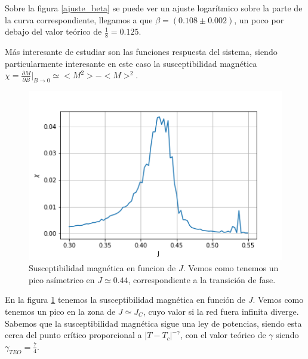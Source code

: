 \documentclass[%
 reprint,
 amsmath,amssymb,
 aps,
]{revtex4-1}
\begin{document}
Sobre la figura \ref{ajuste_beta} se puede ver un ajuste logar\'itmico sobre la
parte de la curva correspondiente, llegamos a que $\beta = (0.108 \pm 0.002)$,
un poco por debajo del valor te\'orico de $\frac{1}{8} = 0.125$.

M\'as interesante de estudiar son las funciones respuesta del sistema, siendo
particularmente interesante en este caso la susceptibilidad magn\'etica $\chi =
\frac{\partial M}{\partial B}|_{B \rightarrow 0} \simeq <M^2> - <M>^2$.

\begin{figure}
  \includegraphics[width=1.0\columnwidth]{images/chi_vs_j.png}
  \caption{Susceptibilidad magn\'etica en funcion de $J$. Vemos como tenemos un
  pico as\'imetrico en $J \simeq 0.44$, correspondiente a la transici\'on de
  fase.}
  \label{chi_vs_j}
\end{figure}

En la figura \ref{chi_vs_j} tenemos la susceptibilidad magn\'etica en funci\'on
de $J$. Vemos como tenemos un pico en la zona de $J \simeq J_C$, cuyo valor si
la red fuera infinita diverge. Sabemos que la susceptibilidad magn\'etica sigue
una ley de potencias, siendo esta cerca del punto cr\'itico proporcional a $|T -
T_c|^{-\gamma}$, con el valor te\'orico de $\gamma$ siendo $\gamma_{TEO} =
\frac{7}{4}$.
\end{document}
